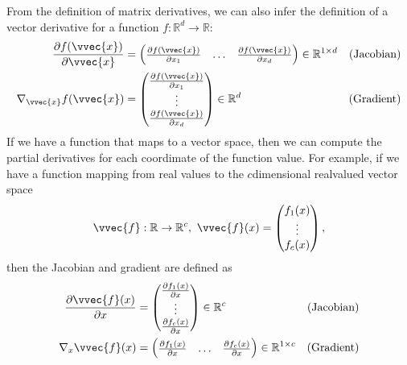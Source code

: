 \documentclass[letterpaper,10pt,english]{jupyterBook}
\begin{document}
\sphinxAtStartPar
From the definition of matrix derivatives, we can also infer the definition of a vector derivative for a function \(f:\mathbb{R}^d\rightarrow \mathbb{R}\):
\begin{align*}
    \frac{\partial f(\vvec{x})}{\partial \vvec{x}} &=
    \begin{pmatrix}
    \frac{\partial f(\vvec{x})}{\partial x_1} & \ldots & \frac{\partial f(\vvec{x})}{\partial x_d}
    \end{pmatrix}\in\mathbb{R}^{1\times d} & \text{(Jacobian)}\\
    \nabla_\vvec{x} f(\vvec{x}) &=
    \begin{pmatrix}
    \frac{\partial f(\vvec{x})}{\partial x_1} \\ \vdots \\ \frac{\partial f(\vvec{x})}{\partial x_d}
    \end{pmatrix}\in\mathbb{R}^{d} &\text{(Gradient)}
\end{align*}
\sphinxAtStartPar
If we have a function that maps to a vector space, then we can compute the partial derivatives for each coordimate of the function value. For example, if we have a function mapping from real values to the \(c\)\sphinxhyphen{}dimensional real\sphinxhyphen{}valued vector space \begin{equation*}
\begin{split}\vvec{f}:\mathbb{R}\rightarrow \mathbb{R}^{c},\ \vvec{f}(x)=\begin{pmatrix}f_1(x)\\\vdots\\f_c(x)\end{pmatrix},\end{split}
\end{equation*} then the Jacobian and gradient are defined as
\begin{align*}
    \frac{\partial \vvec{f}(x)}{\partial x} &=
    \begin{pmatrix}
    \frac{\partial f_1(x)}{\partial x} \\ \vdots \\ \frac{\partial f_c(x)}{\partial x}
    \end{pmatrix} \in\mathbb{R}^{c} & \text{(Jacobian)}\\
    \nabla_x \vvec{f}(x) &=
    \begin{pmatrix}
    \frac{\partial f_1(x)}{\partial x} & \ldots & \frac{\partial f_c(x)}{\partial x}
    \end{pmatrix} \in\mathbb{R}^{1\times c} &\text{(Gradient)}
\end{align*}
\end{document}
